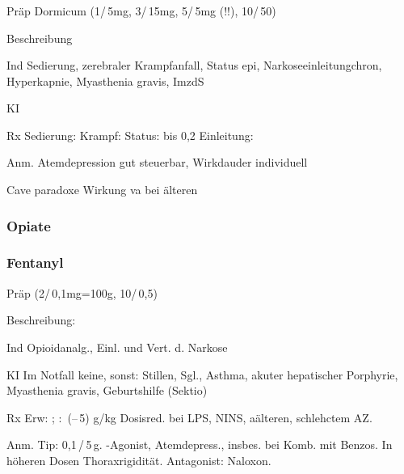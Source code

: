 \subsubsection{}
{
\begin{labeling}[:]{mm}
  \item[Präp] Dormicum (1\Ml*/\,5mg, 3\Ml*/\,15mg, 5\Ml*/\,5mg (!!), 10\Ml*/\,50\Mg*)
  \item[Beschreibung]
  \item[Ind] Sedierung, zerebraler Krampfanfall,
  Status epi, Narkoseeinleitungchron, Hyperkapnie, Myasthenia gravis,
  ImzdS
  \item[KI]
  \item[Rx] Sedierung:  \MgKg\newline
  Krampf: \MgKg\newline
  Status: bis 0,2\MgKg\newline
  Einleitung: \MgKg
  \item[Anm.] Atemdepression gut steuerbar, Wirkdauder individuell
  \item[Cave]  paradoxe Wirkung va bei älteren
\end{labeling}
}


\subsubsection{Opiate}
\subsubsection{Fentanyl}


\begin{labeling}[:]{mm}
  \item[Präp] (2\Ml*/\,0,1mg=100{\textmu}g, 10\Ml*/\,0,5\Mg*)
  \item[Beschreibung:]
  \item[Ind] Opioidanalg., Einl. und Vert. d. Narkose
  \item[KI] Im Notfall keine, sonst: Stillen, Sgl., Asthma, akuter hepatischer
  Porphyrie, Myasthenia gravis, Geburtshilfe (Sektio)
  \item[Rx] Erw: \Mg; : \,(--\,5)
  {\textmu}g/kg \newline Dosisred. bei LPS, NINS, aälteren, schlehctem AZ.
  \item[Anm.] Tip: 0,1\,\Ml*/\,5\,{\textmu}g. {\textmu}-Agonist, Atemdepress.,
  insbes. bei Komb. mit Benzos. In höheren Dosen Thoraxrigidität. Antagonist:
  Naloxon.
\end{labeling}





